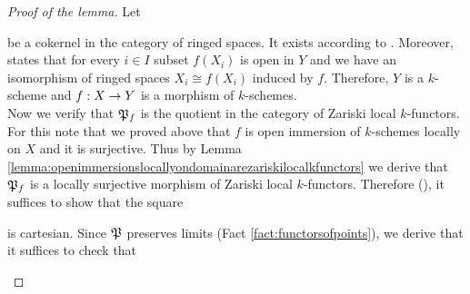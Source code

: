 \begin{proof}[Proof of the lemma]
Let
\begin{center}
\end{center}
be a cokernel in the category of ringed spaces. It exists according to {\cite[Remark 2.3]{LocallyRingedSpaces}}. Moreover, {\cite[Theorem 3.2]{LocallyRingedSpaces}} states that for every $i\in I$ subset $f(X_i)$ is open in $Y$ and we have an isomorphism of ringed spaces $X_i\cong f(X_i)$ induced by $f$. Therefore, $Y$ is a $k$-scheme and $f:X\ra Y$ is a morphism of $k$-schemes.\\
Now we verify that $\fP_f$ is the quotient in the category of Zariski local $k$-functors. For this note that we proved above that $f$ is open immersion of $k$-schemes locally on $X$ and it is surjective. Thus by Lemma \ref{lemma:openimmersionslocallyondomainarezariskilocalkfunctors} we derive that $\fP_f$ is a locally surjective morphism of Zariski local $k$-functors. Therefore ({\cite[Theorem 7.3]{Sheaves}}), it suffices to show that the square
\begin{center}
\end{center}
is cartesian. Since $\fP$ preserves limits (Fact \ref{fact:functorsofpoints}), we derive that it suffices to check that
\begin{center}
\begin{tikzpicture}

\end{tikzpicture}
\end{center}
\end{proof}
